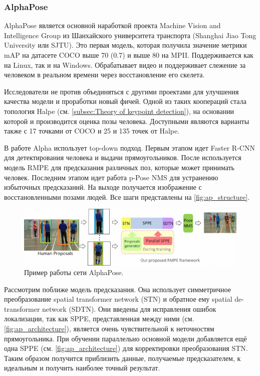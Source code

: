 \subsubsection{AlphaPose}
\label{subsubsec:alphapose_desc}

AlphaPose является основной наработкой проекта Machine Vision and Intelligence Group из Шанхайского университета транспорта (Shanghai Jiao Tong University или SJTU). Это первая модель, которая получила значение метрики mAP на датасете COCO выше 70 (0.7) и выше 80 на MPII. Поддерживается как на Linux, так и на Windows. Обрабатывает видео и поддерживает слежение за человеком в реальном времени через восстановление его скелета.

Исследователи не против объединяться с другими проектами для улучшения качества модели и проработки новый фичей. Одной из таких коопераций стала топология Halpe (см. \autoref{subsec:Theory of keypoint detection}), на основании которой и производится оценка позы человека. Доступными являются варианты также с 17 точками от COCO и 25 и 135 точек от Halpe.

В работе Alpha использует top-down подход. Первым этапом идет Faster R-CNN для детектирования человека и выдачи прямоугольников. После используется модель RMPE для предсказания различных поз, которые может принимать  человек. Последним этапом идет работа p-Pose NMS для устранению избыточных предсказаний. На выходе получается изображение с восстановленными позами людей. Все шаги представлены на \autoref{fig:ap_structure}. \cite{fang2017rmpe}

\begin{figure}[h]
	\centering
	\includegraphics[width=\textwidth]{./images/AlphaPose_structure}
	\caption{Пример работы сети AlphaPose. \cite{fang2017rmpe}}
	\label{fig:ap_structure}
\end{figure}

Рассмотрим поближе модель предсказания. Она использует симметричное преобразование spatial transformer network (STN) и обратное ему spatial de-transformer network (SDTN). Они введены для исправления ошибок локализации, так как SPPE, представленная между ними (см. \autoref{fig:ap_architecture}), является очень чувствительной к неточностям прямоугольника. При обучении параллельно основной модели добавляется ещё одна SPPE (см. \autoref{fig:ap_architecture}) для корректировки преобразования STN. Таким образом получится приблизить данные, получаемые предсказателем, к идеальным и получить наиболее точный результат.

